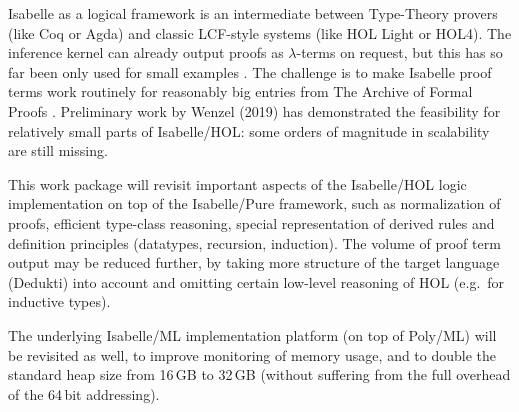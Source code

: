 
Isabelle as a logical framework \cite{paulson700} is an intermediate
between Type-Theory provers (like Coq or Agda) and classic LCF-style
systems (like HOL Light or HOL4). The inference kernel can already
output proofs as $\lambda$-terms on request, but this has so far been
only used for small examples \cite{Berghofer-Nipkow:2000:TPHOL}. The
challenge is to make Isabelle proof terms work routinely for
reasonably big entries from The Archive of Formal Proofs
\cite{isabelle-afp}. Preliminary work by Wenzel (2019) has
demonstrated the feasibility for relatively small parts of
Isabelle/HOL: some orders of magnitude in scalability are still
missing.

This work package will revisit important aspects of the Isabelle/HOL
logic implementation on top of the Isabelle/Pure framework, such as
normalization of proofs, efficient type-class reasoning, special
representation of derived rules and definition principles (datatypes,
recursion, induction). The volume of proof term output may be reduced
further, by taking more structure of the target language (Dedukti)
into account and omitting certain low-level reasoning of HOL (e.g.\
for inductive types).


The underlying Isabelle/ML implementation platform (on top of Poly/ML)
will be revisited as well, to improve monitoring of memory usage, and
to double the standard heap size from 16\,GB to 32\,GB (without
suffering from the full overhead of the 64\,bit
addressing).

